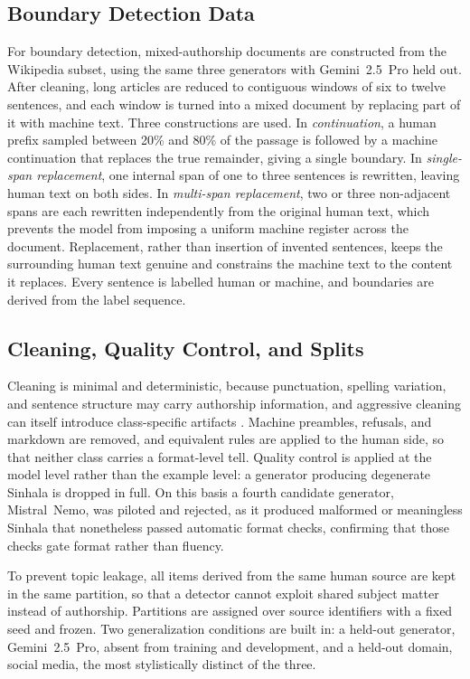 \documentclass[11pt]{article}
\begin{document}
\subsection{Boundary Detection Data}

For boundary detection, mixed-authorship documents are constructed from the Wikipedia subset, using the same three generators with Gemini~2.5~Pro held out. After cleaning, long articles are reduced to contiguous windows of six to twelve sentences, and each window is turned into a mixed document by replacing part of it with machine text. Three constructions are used. In \emph{continuation}, a human prefix sampled between 20\% and 80\% of the passage is followed by a machine continuation that replaces the true remainder, giving a single boundary. In \emph{single-span replacement}, one internal span of one to three sentences is rewritten, leaving human text on both sides. In \emph{multi-span replacement}, two or three non-adjacent spans are each rewritten independently from the original human text, which prevents the model from imposing a uniform machine register across the document. Replacement, rather than insertion of invented sentences, keeps the surrounding human text genuine and constrains the machine text to the content it replaces. Every sentence is labelled human or machine, and boundaries are derived from the label sequence.

\subsection{Cleaning, Quality Control, and Splits}

Cleaning is minimal and deterministic, because punctuation, spelling variation, and sentence structure may carry authorship information, and aggressive cleaning can itself introduce class-specific artifacts \citep{wu-etal-2024-detectrl}. Machine preambles, refusals, and markdown are removed, and equivalent rules are applied to the human side, so that neither class carries a format-level tell. Quality control is applied at the model level rather than the example level: a generator producing degenerate Sinhala is dropped in full. On this basis a fourth candidate generator, Mistral~Nemo, was piloted and rejected, as it produced malformed or meaningless Sinhala that nonetheless passed automatic format checks, confirming that those checks gate format rather than fluency.

To prevent topic leakage, all items derived from the same human source are kept in the same partition, so that a detector cannot exploit shared subject matter instead of authorship. Partitions are assigned over source identifiers with a fixed seed and frozen. Two generalization conditions are built in: a held-out generator, Gemini~2.5~Pro, absent from training and development, and a held-out domain, social media, the most stylistically distinct of the three.
\end{document}
